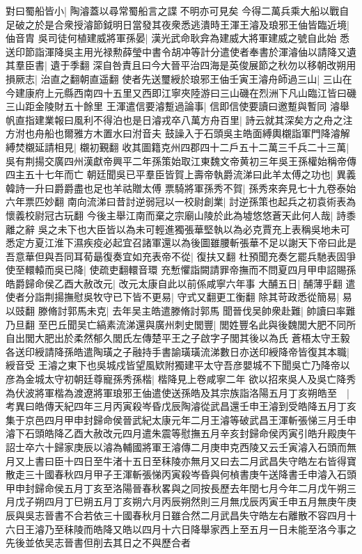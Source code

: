 對曰蜀船皆小|{
	陶濬蓋以尋常蜀船言之諜不明亦可見矣}
今得二萬兵乘大船以戰自足破之於是合衆授濬節鉞明日當發其夜衆悉逃潰時王渾王濬及琅邪王伷皆臨近境|{
	伷音胄}
吳司徒何植建威將軍孫晏|{
	漢光武命耿弇為建威大將軍建威之號自此始}
悉送印節詣渾降吳主用光禄勲薛瑩中書令胡冲等計分遣使者奉書於渾濬伷以請降又遺其羣臣書|{
	遺于季翻}
深自咎責且曰今大晉平治四海是英俊展節之秋勿以移朝改朔用損厥志|{
	治直之翻朝直遥翻}
使者先送璽綬於琅邪王伷壬寅王濬舟師過三山|{
	三山在今建康府上元縣西南四十五里又西即江寧夾陸游曰三山磯在烈洲下凡山臨江皆曰磯三山距金陵財五十餘里}
王渾遣信要濬蹔過論事|{
	信即信使要讀曰邀蹔與暫同}
濬舉帆直指建業報曰風利不得泊也是日濬戎卒八萬方舟百里|{
	詩云就其深矣方之舟之注方泭也舟船也爾雅方木置水曰泭音夫}
鼓譟入于石頭吳主皓面縛輿櫬詣軍門降濬解縛焚櫬延請相見|{
	櫬初覲翻}
收其圖籍克州四郡四十二戶五十二萬三千兵二十三萬|{
	吳有荆揚交廣四州漢獻帝興平二年孫策始取江東魏文帝黄初三年吳王孫權始稱帝傳四主五十七年而亡}
朝廷聞吳已平羣臣皆賀上壽帝執爵流涕曰此羊太傅之功也|{
	異義韓詩一升曰爵爵盡也足也羊祜贈太傅}
票騎將軍孫秀不賀|{
	孫秀來奔見七十九卷泰始六年票匹妙翻}
南向流涕曰昔討逆弱冠以一校尉創業|{
	討逆孫策也起兵之初袁術表為懷義校尉冠古玩翻}
今後主舉江南而棄之宗廟山陵於此為墟悠悠蒼天此何人哉|{
	詩黍離之辭}
吳之未下也大臣皆以為未可輕進獨張華堅執以為必克賈充上表稱吳地未可悉定方夏江淮下濕疾疫必起宜召諸軍還以為後圖雖腰斬張華不足以謝天下帝曰此是吾意華但與吾同耳荀朂復奏宜如充表帝不從|{
	復扶又翻}
杜預聞充奏乞罷兵馳表固爭使至轘轅而吳已降|{
	使疏吏翻轘音環}
充慙懼詣闕請罪帝撫而不問夏四月甲申詔賜孫皓爵歸命侯乙酉大赦改元|{
	改元太康自此以前係咸寧六年事}
大酺五日|{
	酺薄乎翻}
遣使者分詣荆揚撫慰吳牧守已下皆不更易|{
	守式又翻更工衡翻}
除其苛政悉從簡易|{
	易以豉翻}
滕脩討郭馬未克|{
	去年吴主皓遣滕脩討郭馬}
聞晉伐吴帥衆赴難|{
	帥讀曰率難乃旦翻}
至巴丘聞吴亡縞素流涕還與廣州刺史閭豐|{
	閭姓豐名此與後魏閭大肥不同所自出閭大肥出於柔然郁久閭氏左傳楚平王之子啟字子閭其後以為氏}
蒼梧太守王毅各送印綬請降孫皓遣陶璜之子融持手書諭璜璜流涕數日亦送印綬降帝皆復其本職|{
	綬音受}
王濬之東下也吳城戍皆望風欵附獨建平太守吾彦嬰城不下聞吳亡乃降帝以彦為金城太守初朝廷尊寵孫秀孫楷|{
	楷降見上卷咸寧二年}
欲以招來吳人及吳亡降秀為伏波將軍楷為渡遼將軍琅邪王伷遣使送孫皓及其宗族詣洛陽五月丁亥朔皓至　|{
	考異曰皓傳天紀四年三月丙寅殺岑昏戊辰陶濬從武昌還壬申王濬到受皓降五月丁亥集于京邑四月甲申封歸命侯晉武紀太康元年二月王濬等破武昌王渾斬張悌三月壬申濬下石頭皓降乙酉大赦改元四月遣朱震等慰撫五月辛亥封歸命侯丙寅引皓升殿庚午詔士卒六十歸家庚辰以濬為輔國將軍王濬傳二月庚申克西陵又云壬寅濬入石頭而無月又上書曰臣十四日至牛渚十五日至秣陵亦無月又曰去二月武昌失守皓左右皆得寶散走三十國春秋四月甲子王渾斬張悌丙寅殺岑昏與何楨書庚午送降書壬申濬入石頭甲申封歸命侯五月丁亥至洛陽晉春秋畧與之同按長歷去年閏七月今年二月戊午朔三月戊子朔四月丁巳朔五月丁亥朔六月丙辰朔然則三月無戊辰丙寅壬申五月無庚午庚辰與吳志晉書不合若依三十國春秋月日雖合然二月武昌失守皓左右離散不容四月十六日王濬乃至秣陵而皓降又皓以四月十六日降舉家西上至五月一日未能至洛今事之先後並依吴志晉書但削去其日之不與歷合者}

